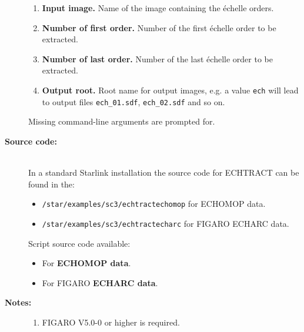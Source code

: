 \documentclass[twoside,11pt]{article}
\newcommand{\htmlref}[2]{#1}
\newenvironment{latexonly}{}{}
\newcommand{\xref}[3]{#1}
\renewcommand{\_}{\texttt{\symbol{95}}}
\begin{document}
\begin{description}
\begin{enumerate}
\item {\bf Input image.}
      Name of the image containing the \'{e}chelle orders.

\item {\bf Number of first order.}
      Number of the first \'{e}chelle order to be extracted.

\item {\bf Number of last order.}
      Number of the last \'{e}chelle order to be extracted.

\item {\bf Output root.}
      Root name for output images, e.g. a value \verb+ech+ will
      lead to output files \verb+ech_01.sdf+, \verb+ech_02.sdf+
      and so on.

\end{enumerate}

     Missing command-line arguments are prompted for.

\item [{\bf Source code:}] \mbox{} \\
\begin{latexonly}
In a standard Starlink installation the source code for ECHTRACT can be found
in the:
\begin{itemize}

\item {\tt /star/examples/sc3/echtract\_echomop} for ECHOMOP data.

\item {\tt /star/examples/sc3/echtract\_echarc} for FIGARO ECHARC data.

\end{itemize}
\end{latexonly}
\begin{htmlonly}
      Script source code available:
\begin{itemize}

\item For \htmlref{{\bf ECHOMOP data}}{se_echtract_echomop_source}.

\item For FIGARO \htmlref{{\bf ECHARC data}}{se_echtract_echarc_source}.

\end{itemize}
\end{htmlonly}

\item [{\bf Notes:}] \mbox{}
\begin{enumerate}
\item \xref{FIGARO}{sun86}{} V5.0-0 or higher is required.


\end{enumerate}
\end{description}
\end{document}
